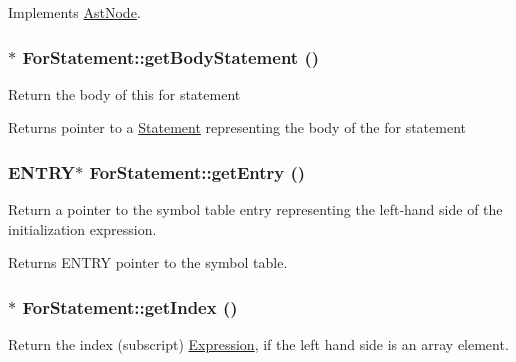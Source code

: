 Implements \hyperlink{classAstNode_a67b2d6ce1262da2954fb4db255759fb3}{AstNode}.\hypertarget{classForStatement_ae52531005fd0fd8cb5e19bba89679548}{
\subsubsection[{getBodyStatement}]{$\ast$ ForStatement::getBodyStatement ()}}
\label{classForStatement_ae52531005fd0fd8cb5e19bba89679548}
Return the body of this for statement

\begin{DoxyReturn}{Returns}
pointer to a \hyperlink{classStatement}{Statement} representing the body of the for statement 
\end{DoxyReturn}
\hypertarget{classForStatement_a42b0ef907ad4181b001392c7cb496cdf}{
\subsubsection[{getEntry}]{\setlength{\rightskip}{0pt plus 5cm}ENTRY$\ast$ ForStatement::getEntry ()}}
\label{classForStatement_a42b0ef907ad4181b001392c7cb496cdf}
Return a pointer to the symbol table entry representing the left-\/hand side of the initialization expression.

\begin{DoxyReturn}{Returns}
ENTRY pointer to the symbol table. 
\end{DoxyReturn}
\hypertarget{classForStatement_a69d2324b4aa27a7bb286e5dfcbebe2bf}{
\subsubsection[{getIndex}]{$\ast$ ForStatement::getIndex ()}}
\label{classForStatement_a69d2324b4aa27a7bb286e5dfcbebe2bf}
Return the index (subscript) \hyperlink{classExpression}{Expression}, if the left hand side is an array element.

